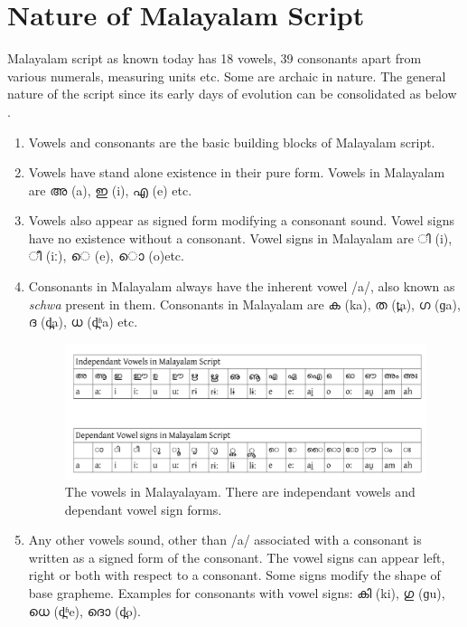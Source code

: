 \documentclass[10pt]{article}
\begin{document}
\section{Nature of Malayalam Script}
\label{scriptnature}
Malayalam script as known today has 18 vowels, 39 consonants apart from various numerals, measuring units etc. Some are archaic in nature. The general nature of the script since its early days of evolution can be consolidated as below \cite{kpanineeyam} .

\begin{enumerate}
	\item
	Vowels and consonants are the basic building blocks of Malayalam script.
	\item
	Vowels have stand alone existence in their pure form. Vowels in Malayalam are {\manjari അ} (a), {\manjari ഇ} (i), {\manjari എ} (e) etc.
	\item
	Vowels also appear as signed form modifying a consonant sound. Vowel signs have no existence without a consonant. Vowel signs in Malayalam are {\manjari  ി} (i), {\manjari ീ} (iː), {\manjari െ} (e), {\manjari ൊ } (o)etc.
	\item Consonants in Malayalam always have the inherent vowel /a/, also known as \textit{schwa} present in them. Consonants in Malayalam are {\manjari ക} (ka), {\manjari ത} (t̪a), {\manjari ഗ} (ɡa), {\manjari ദ} (d̪a), {\manjari ധ} (d̪ʱa) etc.
	
	\begin{figure}[h!]
		\centering
		\includegraphics[width=\textwidth]{images/vowels.png}
		\caption{The vowels in Malayalayam. There are independant vowels and dependant vowel sign forms.}
		\label{vowels}
	\end{figure} 
	
	\item
	Any other vowels sound, other than /a/  associated with a consonant is written as a signed form of the consonant. The vowel signs can  appear left, right or both with respect to a consonant. Some signs modify the shape of base grapheme. Examples for consonants with vowel signs:  {\manjari കി} (ki), {\manjari ഗു} (ɡu), {\manjari ധെ} (d̪ʱe), {\manjari ദൊ} (d̪o). 
	

\end{enumerate}
\end{document}

